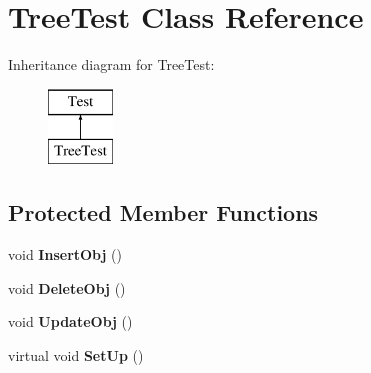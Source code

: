 \hypertarget{classTreeTest}{\section{Tree\+Test Class Reference}
\label{classTreeTest}
}
Inheritance diagram for Tree\+Test\+:\begin{figure}[H]
\begin{center}
\leavevmode
\includegraphics[height=2.000000cm]{classTreeTest}
\end{center}
\end{figure}
\subsection*{Protected Member Functions}
\begin{DoxyCompactItemize}
\item 
\hypertarget{classTreeTest_adaa57828d45a89aadacd259a0e69790a}{void {\bfseries Insert\+Obj} ()}\label{classTreeTest_adaa57828d45a89aadacd259a0e69790a}

\item 
\hypertarget{classTreeTest_a9ab561b627cc999d4c89f94ea53d291b}{void {\bfseries Delete\+Obj} ()}\label{classTreeTest_a9ab561b627cc999d4c89f94ea53d291b}

\item 
\hypertarget{classTreeTest_ae5d5b1281cfa1438ba792ae65f0f6341}{void {\bfseries Update\+Obj} ()}\label{classTreeTest_ae5d5b1281cfa1438ba792ae65f0f6341}

\item 
\hypertarget{classTreeTest_a50caa23d3a9be5549c5b26fe78412602}{virtual void {\bfseries Set\+Up} ()}\label{classTreeTest_a50caa23d3a9be5549c5b26fe78412602}

\end{DoxyCompactItemize}

